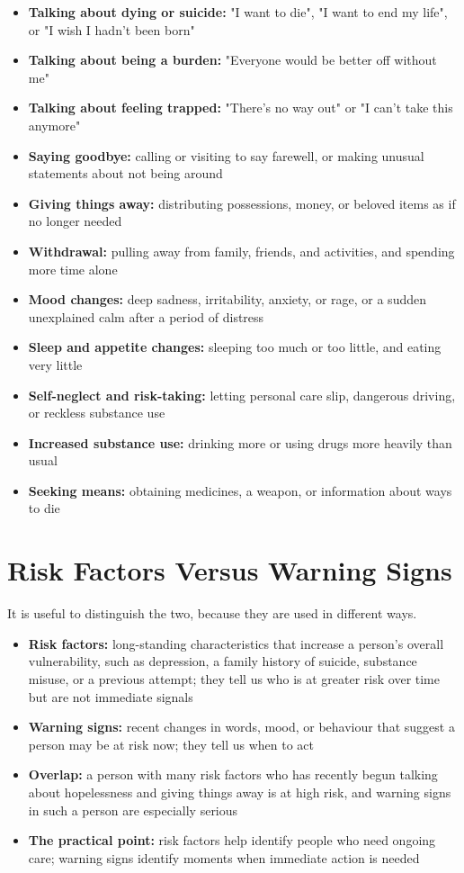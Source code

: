 \begin{itemize}
    \item \textbf{Talking about dying or suicide:} "I want to die", "I want to end my life", or "I wish I hadn't been born"
    \item \textbf{Talking about being a burden:} "Everyone would be better off without me"
    \item \textbf{Talking about feeling trapped:} "There's no way out" or "I can't take this anymore"
    \item \textbf{Saying goodbye:} calling or visiting to say farewell, or making unusual statements about not being around
    \item \textbf{Giving things away:} distributing possessions, money, or beloved items as if no longer needed
    \item \textbf{Withdrawal:} pulling away from family, friends, and activities, and spending more time alone
    \item \textbf{Mood changes:} deep sadness, irritability, anxiety, or rage, or a sudden unexplained calm after a period of distress
    \item \textbf{Sleep and appetite changes:} sleeping too much or too little, and eating very little
    \item \textbf{Self-neglect and risk-taking:} letting personal care slip, dangerous driving, or reckless substance use
    \item \textbf{Increased substance use:} drinking more or using drugs more heavily than usual
    \item \textbf{Seeking means:} obtaining medicines, a weapon, or information about ways to die
\end{itemize}

\section*{Risk Factors Versus Warning Signs}
It is useful to distinguish the two, because they are used in different ways.

\begin{itemize}
    \item \textbf{Risk factors:} long-standing characteristics that increase a person's overall vulnerability, such as depression, a family history of suicide, substance misuse, or a previous attempt; they tell us who is at greater risk over time but are not immediate signals
    \item \textbf{Warning signs:} recent changes in words, mood, or behaviour that suggest a person may be at risk now; they tell us when to act
    \item \textbf{Overlap:} a person with many risk factors who has recently begun talking about hopelessness and giving things away is at high risk, and warning signs in such a person are especially serious
    \item \textbf{The practical point:} risk factors help identify people who need ongoing care; warning signs identify moments when immediate action is needed
\end{itemize}

